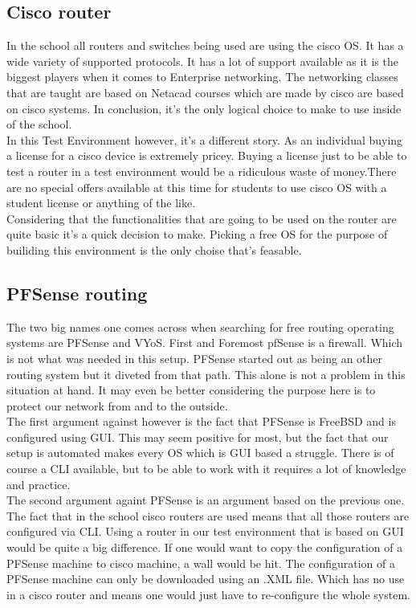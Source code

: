 \subsection{ Cisco router}
In the school all routers and switches being used are using the cisco OS. It has a wide variety of supported protocols. It has a lot of support available as it is the biggest players when it comes to Enterprise networking. The networking classes that are taught are based on Netacad courses which are made by cisco are based on cisco systems. In conclusion, it's the only logical choice to make to use inside of the school. \\
In this Test Environment however, it's a different story. As an individual buying a license for a cisco device is extremely pricey. Buying a license just to be able to test a router in a test environment would be a ridiculous waste of money.There are no special offers available at this time for students to use cisco OS with a student license or anything of the like. \\
Considering that the functionalities that are going to be used on the router are quite basic it's a quick decision to make. Picking a free OS for the purpose of builiding this environment is the only choise that's feasable.
\subsection { PFSense routing }
The two big names one comes across when searching for free routing operating systems are PFSense and VYoS. First and Foremost pfSense is a firewall. Which is not what was needed in this setup. PFSense started out as being an other routing system but it diveted from that path. This alone is not a problem in this situation at hand. It may even be better considering the purpose here is to protect our network from and to the outside. \\
The first argument against however is the fact that PFSense is FreeBSD and is configured using GUI. This may seem positive for most, but the fact that our setup is automated makes every OS which is GUI based a struggle. There is of course a CLI available, but to be able to work with it requires a lot of knowledge and practice. \\
The second argument againt PFSense is an argument based on the previous one. The fact that in the school cisco routers are used means that all those routers are configured via CLI. Using a router in our test environment that is based on GUI would be quite a big difference. If one would want to copy the configuration of a PFSense machine to cisco machine, a wall would be hit. The configuration of a PFSense machine can only be downloaded using an .XML file. Which has no use in a cisco router and means one would just have to re-configure the whole system.
